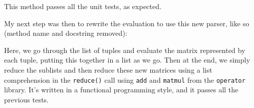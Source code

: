 \documentclass[../development.tex]{subfiles}
\begin{document}
This method passes all the unit tests, as expected.

My next step was then to rewrite the evaluation to use this new parser, like so (method name and docstring removed):


Here, we go through the list of tuples and evaluate the matrix represented by each tuple, putting this together in a list as we go. Then at the end, we simply reduce the sublists and then reduce these new matrices using a list comprehension in the \texttt{reduce()} call using \texttt{add} and \texttt{matmul} from the \texttt{operator} library. It's written in a functional programming style, and it passes all the previous tests.
\end{document}
